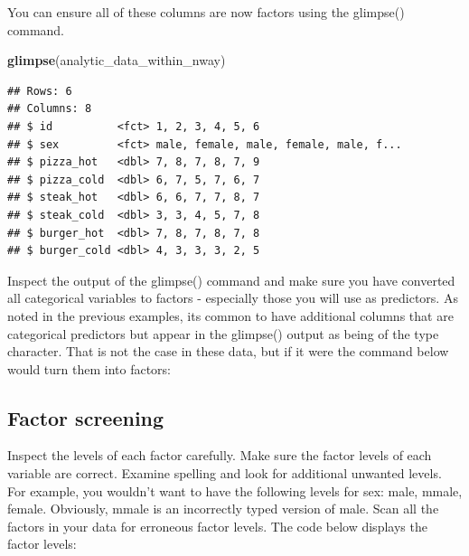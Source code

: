 \documentclass[
]{krantz}
\makeatletter
\newenvironment{Shaded}{\begin{snugshade}}{\end{snugshade}}
\newcommand{\DataTypeTok}[1]{\textcolor[rgb]{0.27,0.27,0.27}{#1}}
\newcommand{\KeywordTok}[1]{\textcolor[rgb]{0.27,0.27,0.27}{\textbf{#1}}}
\newcommand{\NormalTok}[1]{#1}
\newcommand{\OperatorTok}[1]{\textcolor[rgb]{0.43,0.43,0.43}{\textbf{#1}}}
\newcommand{\StringTok}[1]{\textcolor[rgb]{0.5,0.5,0.5}{#1}}
\newenvironment{kframe}{%
\medskip{}
\setlength{\fboxsep}{.8em}
 \def\at@end@of@kframe{}%
 \ifinner\ifhmode%
  \def\at@end@of@kframe{\end{minipage}}%
  \begin{minipage}{\columnwidth}%
 \fi\fi%
 \def\FrameCommand##1{\hskip\@totalleftmargin \hskip-\fboxsep
 \colorbox{shadecolor}{##1}\hskip-\fboxsep
     \hskip-\linewidth \hskip-\@totalleftmargin \hskip\columnwidth}%
 \MakeFramed {\advance\hsize-\width
   \@totalleftmargin\z@ \linewidth\hsize
   \@setminipage}}%
 {\par\unskip\endMakeFramed%
 \at@end@of@kframe}
\renewenvironment{Shaded}{\begin{kframe}}{\end{kframe}}
\makeatother
\begin{document}
You can ensure all of these columns are now factors using the glimpse() command.

\begin{Shaded}
\begin{Highlighting}[]
\KeywordTok{glimpse}\NormalTok{(analytic_data_within_nway)}
\end{Highlighting}
\end{Shaded}

\begin{verbatim}
## Rows: 6
## Columns: 8
## $ id          <fct> 1, 2, 3, 4, 5, 6
## $ sex         <fct> male, female, male, female, male, f...
## $ pizza_hot   <dbl> 7, 8, 7, 8, 7, 9
## $ pizza_cold  <dbl> 6, 7, 5, 7, 6, 7
## $ steak_hot   <dbl> 6, 6, 7, 7, 8, 7
## $ steak_cold  <dbl> 3, 3, 4, 5, 7, 8
## $ burger_hot  <dbl> 7, 8, 7, 8, 7, 8
## $ burger_cold <dbl> 4, 3, 3, 3, 2, 5
\end{verbatim}

Inspect the output of the glimpse() command and make sure you have converted all categorical variables to factors - especially those you will use as predictors. As noted in the previous examples, its common to have additional columns that are categorical predictors but appear in the glimpse() output as being of the type character. That is not the case in these data, but if it were the command below would turn them into factors:

\begin{Shaded}
\end{Shaded}

\hypertarget{factor-screening-2}{%
\subsection{Factor screening}\label{factor-screening-2}}

Inspect the levels of each factor carefully. Make sure the factor levels of each variable are correct. Examine spelling and look for additional unwanted levels. For example, you wouldn't want to have the following levels for sex: male, mmale, female. Obviously, mmale is an incorrectly typed version of male. Scan all the factors in your data for erroneous factor levels. The code below displays the factor levels:
\end{document}

